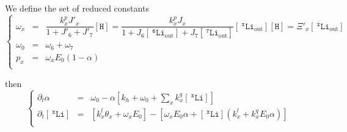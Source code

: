 \documentclass[aps,onecolumn,12pt]{revtex4}
\newcommand{\mychem}[1]{\mathtt{#1}}
\newcommand{\myconc}[1]{\left\lbrack{#1}\right\rbrack}
\newcommand{\spLi}[1]{{~^{\mychem{#1}}\mychem{Li}}}
\newcommand{\Li}[1]{\myconc{\spLi{#1}}}
\newcommand{\spLiOut}[1]{{\spLi{#1}}_{\mathrm{out}}}
\newcommand{\LiOut}[1]{\myconc{\spLiOut{#1}}}
\newcommand{\spproton}{\mychem{H}}
\newcommand{\proton}{\myconc{\spproton}}
\begin{document}
We define the set of reduced constants
\begin{equation}
\left\lbrace
	\begin{array}{rcl}
	\omega_x & = &  \dfrac{k_x^pJ'_x}{1+J'_6+J'_7}\proton = \dfrac{k_x^p J_x}{1+J_6\LiOut{6}+J_7\LiOut{7}} \LiOut{x}\proton = \Xi'_x \LiOut{x}\\
	\omega_0 & = & \omega_6 + \omega_7\\
	p_x & = & \omega_x E_0 \left(1-\alpha\right)\\
	\end{array}
\right.
\end{equation}


then
\begin{equation}
\boxed{
\left\lbrace
	\begin{array}{rcl}
		\partial_t\alpha    & = & \omega_0 - \alpha\left\lbrack k_h+\omega_0+{\sum_x k_x^q \Li{x}} \right\rbrack\\
		\partial_t\Li{x} & = & \left\lbrack k_x^l\theta_x+\omega_x E_0\right\rbrack
		-\left\lbrack
			\omega_x E_0\alpha +  \Li{x}  \left(k_x^l+ k_x^q E_0\alpha\right)
		\right\rbrack\\
	\end{array}
\right.
}
\end{equation}
\end{document}
